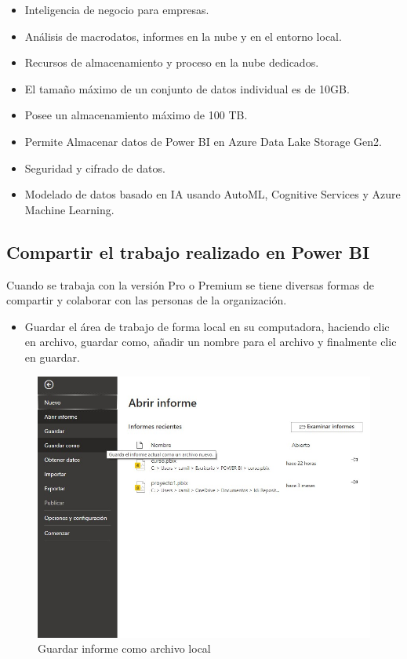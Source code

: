 \documentclass[
]{book}
\providecommand{\tightlist}{%
  \setlength{\itemsep}{0pt}\setlength{\parskip}{0pt}}
\begin{document}
\begin{itemize}
  \begin{itemize}
  \tightlist
  \item
    Inteligencia de negocio para empresas.
  \item
    Análisis de macrodatos, informes en la nube y en el entorno local.
  \item
    Recursos de almacenamiento y proceso en la nube dedicados.
  \item
    El tamaño máximo de un conjunto de datos individual es de 10GB.
  \item
    Posee un almacenamiento máximo de 100 TB.
  \item
    Permite Almacenar datos de Power BI en Azure Data Lake Storage Gen2.
  \item
    Seguridad y cifrado de datos.
  \item
    Modelado de datos basado en IA usando AutoML, Cognitive Services y Azure Machine Learning.
  \end{itemize}
\end{itemize}

\hypertarget{compartir-el-trabajo-realizado-en-power-bi}{%
\subsection{Compartir el trabajo realizado en Power BI}\label{compartir-el-trabajo-realizado-en-power-bi}}

Cuando se trabaja con la versión Pro o Premium se tiene diversas formas de compartir y colaborar con las personas de la organización.

\begin{itemize}
\tightlist
\item
  Guardar el área de trabajo de forma local en su computadora, haciendo clic en archivo, guardar como, añadir un nombre para el archivo y finalmente clic en guardar.
\end{itemize}

\begin{figure}

{\centering \includegraphics[width=0.6\linewidth]{Imágenes/powerbi1} 

}

\caption{Guardar informe como archivo local}\label{fig:guardarinforme-fig}
\end{figure}
\end{document}
